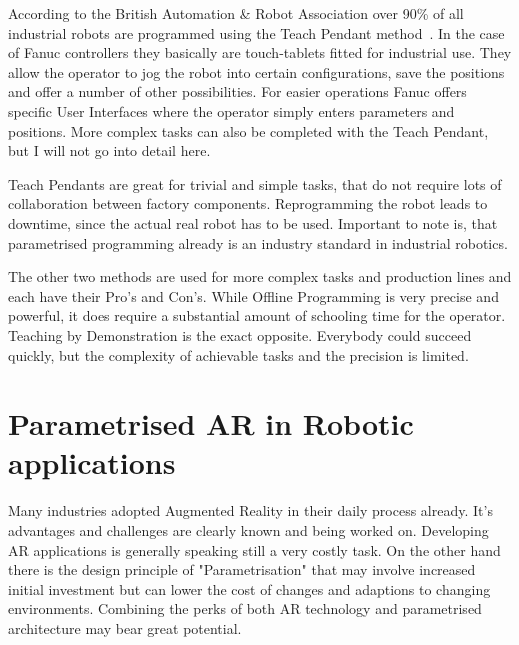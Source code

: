 According to the British Automation \& Robot Association over 90\% of all industrial robots are programmed using the Teach Pendant method~\cite{bara}. In the case of Fanuc controllers they basically are touch-tablets fitted for industrial use. They allow the operator to jog the robot into certain configurations, save the positions and offer a number of other possibilities. For easier operations Fanuc offers specific User Interfaces where the operator simply enters parameters and positions. More complex tasks can also be completed with the Teach Pendant, but I will not go into detail here. 

Teach Pendants are great for trivial and simple tasks, that do not require lots of collaboration between factory components. Reprogramming the robot leads to downtime, since the actual real robot has to be used. Important to note is, that parametrised programming already is an industry standard in industrial robotics. 

The other two methods are used for more complex tasks and production lines and each have their Pro's and Con's. While Offline Programming is very precise and powerful, it does require a substantial amount of schooling time for the operator. Teaching by Demonstration is the exact opposite. Everybody could succeed quickly, but the complexity of achievable tasks and the precision is limited.

\section{Parametrised AR in Robotic applications}

Many industries adopted Augmented Reality in their daily process already. It's advantages and challenges are clearly known and being worked on. Developing AR applications is generally speaking still a very costly task. On the other hand there is the design principle of "Parametrisation" that may involve increased initial investment but can lower the cost of changes and adaptions to changing environments. Combining the perks of both AR technology and parametrised architecture may bear great potential.












